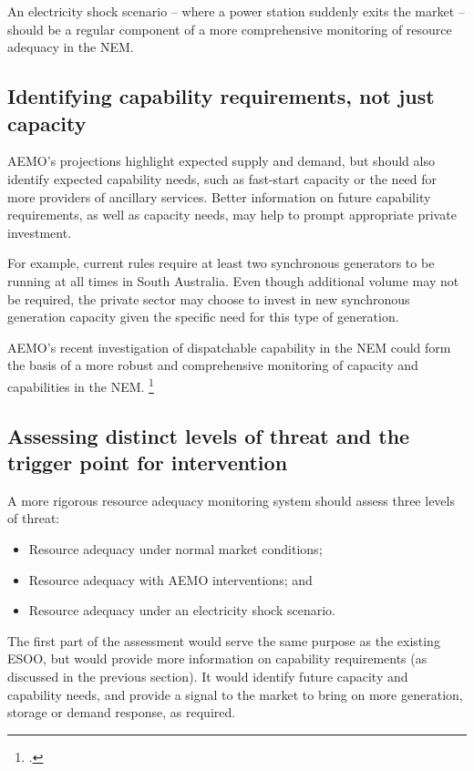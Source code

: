 \documentclass[FrontPage]{grattan}
\begin{document}
An electricity shock scenario -- where a power station suddenly exits the market -- should be a regular component of a more comprehensive monitoring of resource adequacy in the NEM\@.

\subsection{Identifying capability requirements, not just capacity}\label{subsec:identifying-capability-requirements-not-just-capacity}
AEMO's projections highlight expected supply and demand, but should also identify expected capability needs, such as fast-start capacity or the need for more providers of ancillary services. Better information on future capability requirements, as well as capacity needs, may help to prompt appropriate private investment.

For example, current rules require at least two synchronous generators to be running at all times in South Australia. Even though additional volume may not be required, the private sector may choose to invest in new synchronous generation capacity given the specific need for this type of generation.

AEMO's recent investigation of dispatchable capability in the NEM could form the basis of a more robust and comprehensive monitoring of capacity and capabilities in the NEM\@.%
\footcite{AEMO2017AdviceDispatchableCapacity}

\subsection{Assessing distinct levels of threat and the trigger point for intervention}\label{subsec:threat-levels-and-trigger-points}
A more rigorous resource adequacy monitoring system should assess three levels of threat:
\begin{itemize}
    \item Resource adequacy under normal market conditions;
    \item Resource adequacy with AEMO interventions; and
    \item Resource adequacy under an electricity shock scenario.
\end{itemize}

The first part of the assessment would serve the same purpose as the existing ESOO, but would provide more information on capability requirements (as discussed in the previous section). It would identify future capacity and capability needs, and provide a signal to the market to bring on more generation, storage or demand response, as required.
\end{document}
